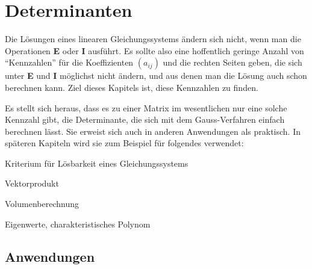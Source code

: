 %
%
%
\chapter{Determinanten\label{chapter-determinanten}}
Die Lösungen eines linearen Gleichungssystems ändern sich nicht,
wenn man die Operationen {\bf E} oder {\bf I} ausführt.
Es sollte
also eine hoffentlich geringe Anzahl von ``Kennzahlen'' für die
Koeffizienten $(a_{ij})$
und die rechten Seiten geben, die sich unter {\bf E} und {\bf I}
möglichst nicht ändern, und aus denen man die Lösung auch
schon berechnen kann.
Ziel dieses Kapitels ist, diese Kennzahlen zu finden.

Es stellt sich heraus, dass es zu einer Matrix
im wesentlichen nur eine solche Kennzahl gibt, die Determinante,
die sich mit dem Gauss-Verfahren einfach berechnen lässt.
Sie erweist sich auch in anderen Anwendungen als praktisch.
In späteren Kapiteln
wird sie zum Beispiel für folgendes verwendet:
\begin{compactitem}
\item Kriterium für Lösbarkeit eines Gleichungssystems
\item Vektorprodukt
\item Volumenberechnung
\item Eigenwerte, charakteristisches Polynom
\end{compactitem}









\section{Anwendungen}


